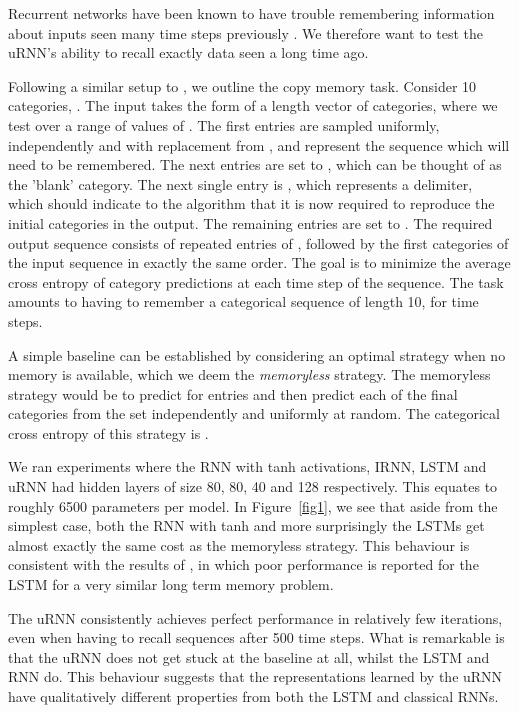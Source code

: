 \documentclass{article}
\begin{document}
Recurrent networks have been known to have trouble remembering information about inputs seen
many time steps previously \citep{Yoshua94, Pascanu2013}. 
We therefore want to test the uRNN's ability to recall exactly data seen a long time ago.

Following a similar setup to \cite{LSTM}, we outline the copy memory task.
Consider 10 categories, .   
The input takes the form of a  length vector of categories, where we test over a range of values
of . 
The first  entries are sampled uniformly, independently and with replacement from ,
and represent the sequence which will need to be remembered. 
The next  entries are set to , which can be thought of as the 'blank' category. 
The next single entry is , which represents a delimiter, which should indicate to the algorithm
that it is now required to reproduce the initial  categories in the output. 
The remaining  entries are set to . The required output sequence consists of  
repeated entries of , followed by the first  categories of the input sequence in exactly the
same order. The goal is to minimize the average cross entropy of category predictions 
at each time step of the sequence.
The task amounts to having to remember a categorical sequence of length 10, for  time steps.

A simple baseline can be established by considering an optimal strategy when no memory is available, 
which we deem the \textit{memoryless} strategy. The memoryless strategy would be to predict  for 
 entries and then predict each of the final  categories from the set  independently
and uniformly at random. The categorical cross entropy of this strategy is . 

We ran experiments where the RNN with tanh activations, IRNN, LSTM and uRNN had hidden layers of size 
80, 80, 40 and 128 respectively. This equates to roughly 6500 parameters per model. 
In Figure~\ref{fig1}, we see that aside from the simplest case, both the RNN with tanh and more surprisingly 
the LSTMs get almost exactly the same cost as the memoryless strategy. This behaviour is consistent 
with the results of \cite{NTM}, in which poor performance is reported for the LSTM for a very similar 
long term memory problem.

The uRNN consistently achieves perfect performance in relatively few iterations, even when having to recall
sequences after 500 time steps. What is remarkable is that the uRNN does not get stuck at the baseline at 
all, whilst the LSTM and RNN do. This behaviour suggests that the representations learned by the uRNN
have qualitatively different properties from both the LSTM and classical RNNs. 
\end{document}
